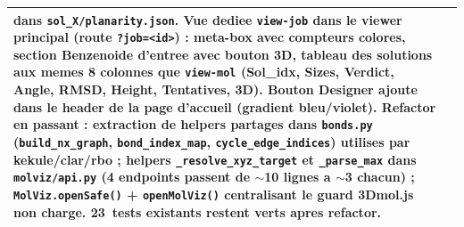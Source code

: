 \begin{center}
\begin{tabular}{lp{11cm}}
    dans \texttt{sol\_X/planarity.json}. \textbf{Vue dediee
    \texttt{view-job} dans le viewer principal} (route
    \texttt{?job=<id>}) : meta-box avec compteurs colores, section
    \og{}Benzenoide d'entree\fg{} avec bouton 3D, tableau des solutions
    aux memes 8 colonnes que \texttt{view-mol}
    (Sol\_idx, Sizes, Verdict, Angle, RMSD, Height, Tentatives, 3D).
    Bouton \og{}Designer\fg{} ajoute dans le header de la page
    d'accueil (gradient bleu/violet). \textbf{Refactor en passant :}
    extraction de helpers partages dans \texttt{bonds.py}
    (\texttt{build\_nx\_graph}, \texttt{bond\_index\_map},
    \texttt{cycle\_edge\_indices}) utilises par kekule/clar/rbo ;
    helpers \texttt{\_resolve\_xyz\_target} et \texttt{\_parse\_max}
    dans \texttt{molviz/api.py} (4 endpoints passent de
    $\sim$10 lignes a $\sim$3 chacun) ; \texttt{MolViz.openSafe()} +
    \texttt{openMolViz()} centralisant le guard \og{}3Dmol.js non
    charge\fg{}. 23~tests existants restent verts apres refactor. \\
  \bottomrule
\end{tabular}
\end{center}

\newpage
